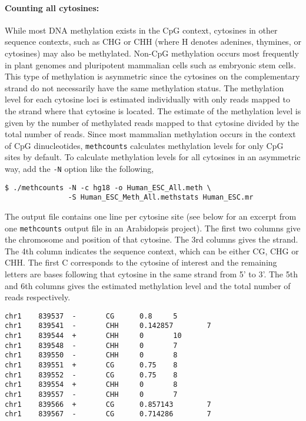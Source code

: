 \documentclass[10pt]{article}
\newcommand{\prog}[1]{\texttt{#1}}
\newcommand{\op}[1]{\texttt{#1}}
\begin{document}
\paragraph{Counting all cytosines:}
While most DNA methylation exists in the CpG context, cytosines in
other sequence contexts, such as CHG or CHH (where H denotes adenines,
thymines, or cytosines) may also be methylated. Non-CpG methylation
occurs most frequently in plant genomes and pluripotent mammalian
cells such as embryonic stem cells. This type of methylation is
asymmetric since the cytosines on the complementary strand do not
necessarily have the same methylation status. The methylation level
for each cytosine loci is estimated individually with only reads
mapped to the strand where that cytosine is located. The estimate of
the methylation level is given by the number of methylated reads
mapped to that cytosine divided by the total number of reads. Since
most mammalian methylation occurs in the context of CpG dinucleotides,
\prog{methcounts} calculates methylation levels for only CpG sites by
default. To calculate methylation levels for all cytosines in an
asymmetric way, add the \op{-N} option like the following,
\begin{verbatim}
$ ./methcounts -N -c hg18 -o Human_ESC_All.meth \
               -S Human_ESC_Meth_All.methstats Human_ESC.mr
\end{verbatim}

The output file contains one line per cytosine site (see below for an
excerpt from one \prog{methcounts} output file in an Arabidopsis
project). The first two columns give the chromosome and position of
that cytosine. The 3rd columns gives the strand. The 4th column
indicates the sequence context, which can be either CG, CHG or CHH.
The first C corresponds to the cytosine of interest and the
remaining letters are bases following that cytosine in the same
strand from 5' to 3'. The 5th and 6th columns gives the estimated
methylation level and the total number of reads respectively.
{\small{%
\begin{verbatim}
chr1    839537  -       CG      0.8     5
chr1    839541  -       CHH     0.142857        7
chr1    839544  +       CHH     0       10
chr1    839548  -       CHH     0       7
chr1    839550  -       CHH     0       8
chr1    839551  +       CG      0.75    8
chr1    839552  -       CG      0.75    8
chr1    839554  +       CHH     0       8
chr1    839557  -       CHH     0       7
chr1    839566  +       CG      0.857143        7
chr1    839567  -       CG      0.714286        7
\end{verbatim}%
}}
\end{document}
